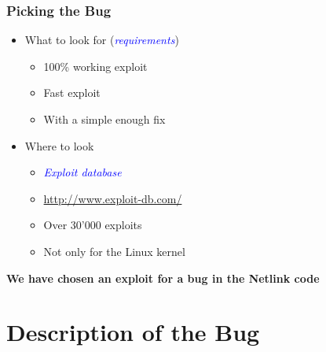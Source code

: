 \documentclass[xcolor=dvipsnames]{beamer}
\let\Oldemph\emph
\renewcommand{\emph}[1]{\textcolor{blue}{\Oldemph{#1}}}
\newcommand{\heading}[1]{\textbf{\textcolor{BurntOrange}{#1}}}
\begin{document}
\begin{frame}
  \frametitle{Picking the Bug}

  \begin{itemize}
    \item What to look for (\emph{requirements})
    \begin{itemize}
      \item 100\% working exploit
      \item Fast exploit
      \item With a simple enough fix
    \end{itemize}

    \pause
    \medskip

    \item Where to look
    \begin{itemize}
      \item \emph{Exploit database}
      \item \url{http://www.exploit-db.com/}
      \item Over 30'000 exploits
      \item Not only for the Linux kernel
    \end{itemize}

  \end{itemize}

  \bigskip
  \pause

  \begin{center}
    \heading{We have chosen an exploit for a bug in the Netlink code}
  \end{center}

\end{frame}

\section{Description of the Bug}
\frame{\sectionpage}
\end{document}
